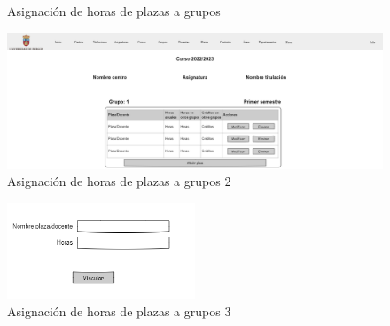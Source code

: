 \begin{itemize}
\begin{itemize}
\begin{figure}[!h]
		\caption{Asignación de horas de plazas a grupos}\label{F-CU3_3}
		\end{figure}
		\FloatBarrier
		\begin{figure}[!h]
		\centering
		\includegraphics[width=\textwidth]{../img/Anexos/Vistas/asig_horas_plaza_grupo.png}
		\caption{Asignación de horas de plazas a grupos 2}\label{F-CU3_3(1)}
		\end{figure}
		\FloatBarrier
		\begin{figure}[!h]
		\centering
		\includegraphics[width=0.5\textwidth]{../img/Anexos/Vistas/asig_horas_plaza_grupo_modal.png}
		\caption{Asignación de horas de plazas a grupos 3}\label{F-CU3_3(2)}
		\end{figure}
		\FloatBarrier
	\end{itemize}
\end{itemize}


